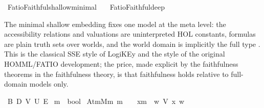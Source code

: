 %
\begin{isabellebody}%
%
%
\isadelimdocument
%
\endisadelimdocument
%
\isatagdocument
%
\isamarkuptrue%
%
\endisatagdocument
{\isafolddocument}%
%
\isadelimdocument
%
\endisadelimdocument
%
\isadelimtheory
%
\endisadelimtheory
%
\isatagtheory
{}\isamarkupfalse%
\ FatioFaithful{\isacharunderscore}{\kern0pt}shallow{\isacharunderscore}{\kern0pt}minimal\isanewline
\ \ \ FatioFaithful{\isacharunderscore}{\kern0pt}deep\isanewline
{}%
\endisatagtheory
{\isafoldtheory}%
%
\isadelimtheory
%
\endisadelimtheory
%
\begin{isamarkuptext}%
The minimal shallow embedding fixes one model at the meta level: the
accessibility relations and valuations are uninterpreted HOL constants, formulas
are plain truth sets over worlds, and the world domain is implicitly the full type
\isa{{\isasymw}}. This is the classical SSE style of LogiKEy \cite{LogiKEy2020} and the style of the
original HOMML/FATIO development; the price, made explicit by the faithfulness
theorems in the faithfulness theory, is that faithfulness holds relative to full-domain models only.%
\end{isamarkuptext}\isamarkuptrue%
\isamarkupfalse%
\ B\ D\ V\ U\ E\isanewline
\isanewline
{}\isamarkupfalse%
\ {\isasymsigma}\isactrlsub m\ {\isacharequal}{\kern0pt}\ {\isachardoublequoteopen}{\isasymw}{\isasymRightarrow}bool{\isachardoublequoteclose}\isanewline
\isanewline
{}\isamarkupfalse%
\ AtmM{\isacharcolon}{\kern0pt}{\isacharcolon}{\kern0pt}{\isachardoublequoteopen}{\isasymS}{\isasymRightarrow}{\isasymsigma}\isactrlsub m{\isachardoublequoteclose}\ {\isacharparenleft}{\kern0pt}{\isachardoublequoteopen}{\isacharunderscore}{\kern0pt}\isactrlsup m{\isachardoublequoteclose}\ {\isacharbrackleft}{\kern0pt}{}{}{}{}{\isacharbrackright}{\kern0pt}\ {}{}{}{\isacharparenright}{\kern0pt}\ \ {\isachardoublequoteopen}x\isactrlsup m\ {\isasymequiv}\ {\isasymlambda}w{\isachardot}{\kern0pt}\ V\ x\ w{\isachardoublequoteclose}\isanewline

\end{isabellebody}
